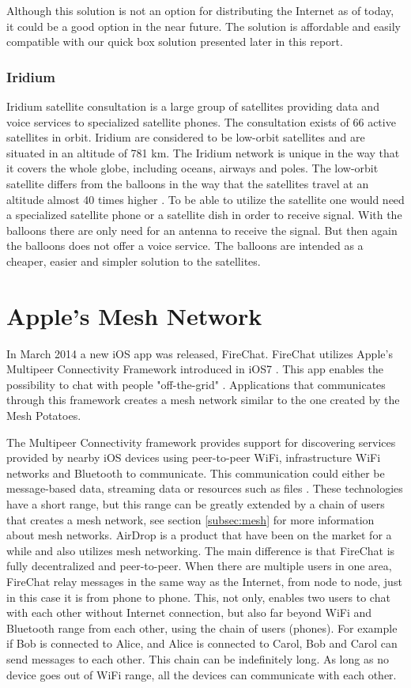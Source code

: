 Although this solution is not an option for distributing the Internet as of today, it could be a good option in the near future. The solution is affordable and easily compatible with our \gls{quick} box solution presented later in this report. 

\subsubsection{Iridium}
Iridium satellite consultation is a large group of satellites providing data and voice services to specialized satellite phones. The consultation exists of 66 active satellites in orbit. Iridium are considered to be low-orbit satellites and are situated in an altitude of 781 km. The Iridium network is unique in the way that it covers the whole globe, including oceans, airways and poles. The low-orbit satellite differs from the balloons in the way that the satellites travel at an altitude almost 40 times higher \cite{iridium}. To be able to utilize the satellite one would need a specialized satellite phone or a satellite dish in order to receive signal. With the balloons there are only need for an antenna to receive the signal. But then again the balloons does not offer a voice service. The balloons are intended as a cheaper, easier and simpler solution to the satellites.                                         

\section{Apple's Mesh Network}
In March 2014 a new iOS app was released, FireChat. FireChat utilizes Apple's Multipeer Connectivity Framework introduced in iOS7 \cite{appleMesh}. This app enables the possibility to chat with people "off-the-grid" \cite{fireChat}. Applications that communicates through this framework creates a mesh network similar to the one created by the Mesh Potatoes. 

The Multipeer Connectivity framework provides support for discovering services provided by nearby iOS devices using peer-to-peer WiFi, infrastructure WiFi networks and Bluetooth to communicate. This communication could either be message-based data, streaming data or resources such as files \cite{multipeer}. These technologies have a short range, but this range can be greatly extended by a chain of users that creates a mesh network, see section \ref{subsec:mesh} for more information about mesh networks. AirDrop is a product that have been on the market for a while and also utilizes mesh networking. The main difference is that FireChat is fully decentralized and peer-to-peer. When there are multiple users in one area, FireChat relay messages in the same way as the Internet, from node to node, just in this case it is from phone to phone.  This, not only, enables two users to chat with each other without Internet connection, but also far beyond WiFi and Bluetooth range from each other, using the chain of users (phones). For example if Bob is connected to Alice, and Alice is connected to Carol, Bob and Carol can send messages to each other. This chain can be indefinitely long. As long as no device goes out of WiFi range, all the devices can communicate with each other. 

